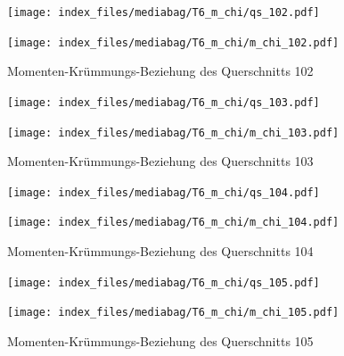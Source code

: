 \documentclass[
  11pt,
  letterpaper,
]{scrreprt}
\begin{document}
\begin{figure}[H]

\begin{minipage}{0.50\linewidth}
\texttt{[image: index\_files/mediabag/T6\_m\_chi/qs\_102.pdf]}\end{minipage}%
%
\begin{minipage}{0.50\linewidth}
\texttt{[image: index\_files/mediabag/T6\_m\_chi/m\_chi\_102.pdf]}\end{minipage}%

\caption{\label{fig-mchi_anhang}Momenten-Krümmungs-Beziehung des
Querschnitts 102}

\end{figure}%

\begin{figure}[H]

\begin{minipage}{0.50\linewidth}
\texttt{[image: index\_files/mediabag/T6\_m\_chi/qs\_103.pdf]}\end{minipage}%
%
\begin{minipage}{0.50\linewidth}
\texttt{[image: index\_files/mediabag/T6\_m\_chi/m\_chi\_103.pdf]}\end{minipage}%

\caption{\label{fig-mchi_anhang}Momenten-Krümmungs-Beziehung des
Querschnitts 103}

\end{figure}%

\begin{figure}[H]

\begin{minipage}{0.50\linewidth}
\texttt{[image: index\_files/mediabag/T6\_m\_chi/qs\_104.pdf]}\end{minipage}%
%
\begin{minipage}{0.50\linewidth}
\texttt{[image: index\_files/mediabag/T6\_m\_chi/m\_chi\_104.pdf]}\end{minipage}%

\caption{\label{fig-mchi_anhang}Momenten-Krümmungs-Beziehung des
Querschnitts 104}

\end{figure}%

\begin{figure}[H]

\begin{minipage}{0.50\linewidth}
\texttt{[image: index\_files/mediabag/T6\_m\_chi/qs\_105.pdf]}\end{minipage}%
%
\begin{minipage}{0.50\linewidth}
\texttt{[image: index\_files/mediabag/T6\_m\_chi/m\_chi\_105.pdf]}\end{minipage}%

\caption{\label{fig-mchi_anhang}Momenten-Krümmungs-Beziehung des
Querschnitts 105}

\end{figure}%
\end{document}
